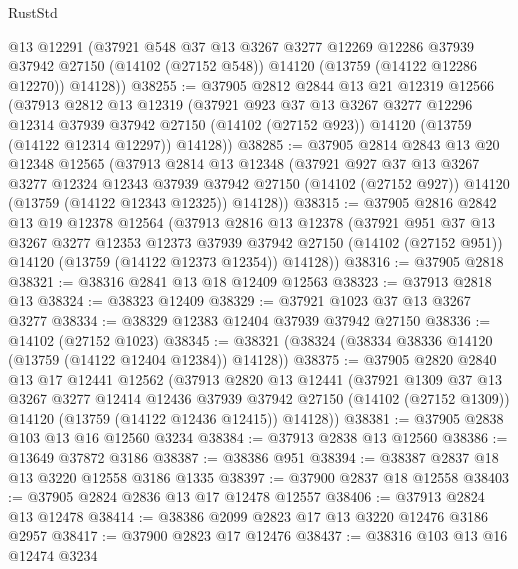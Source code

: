 \begin{lexlean}{RustStd}
\begin{coremodule}
      @13
      @12291
      (@37921
        @548
        @37
        @13
        @3267
        @3277
        @12269
        @12286
        @37939
        @37942
        @27150
        (@14102 (@27152 @548))
        @14120
        (@13759 (@14122 @12286 @12270))
        @14128))
@38255 := @37905
    @2812
    @2844
    @13
    @21
    @12319
    @12566
    (@37913
      @2812
      @13
      @12319
      (@37921
        @923
        @37
        @13
        @3267
        @3277
        @12296
        @12314
        @37939
        @37942
        @27150
        (@14102 (@27152 @923))
        @14120
        (@13759 (@14122 @12314 @12297))
        @14128))
@38285 := @37905
    @2814
    @2843
    @13
    @20
    @12348
    @12565
    (@37913
      @2814
      @13
      @12348
      (@37921
        @927
        @37
        @13
        @3267
        @3277
        @12324
        @12343
        @37939
        @37942
        @27150
        (@14102 (@27152 @927))
        @14120
        (@13759 (@14122 @12343 @12325))
        @14128))
@38315 := @37905
    @2816
    @2842
    @13
    @19
    @12378
    @12564
    (@37913
      @2816
      @13
      @12378
      (@37921
        @951
        @37
        @13
        @3267
        @3277
        @12353
        @12373
        @37939
        @37942
        @27150
        (@14102 (@27152 @951))
        @14120
        (@13759 (@14122 @12373 @12354))
        @14128))
@38316 := @37905 @2818
@38321 := @38316 @2841 @13 @18 @12409 @12563
@38323 := @37913 @2818 @13
@38324 := @38323 @12409
@38329 := @37921 @1023 @37 @13 @3267 @3277
@38334 := @38329 @12383 @12404 @37939 @37942 @27150
@38336 := @14102 (@27152 @1023)
@38345 := @38321 (@38324 (@38334 @38336 @14120 (@13759 (@14122 @12404 @12384)) @14128))
@38375 := @37905
    @2820
    @2840
    @13
    @17
    @12441
    @12562
    (@37913
      @2820
      @13
      @12441
      (@37921
        @1309
        @37
        @13
        @3267
        @3277
        @12414
        @12436
        @37939
        @37942
        @27150
        (@14102 (@27152 @1309))
        @14120
        (@13759 (@14122 @12436 @12415))
        @14128))
@38381 := @37905 @2838 @103 @13 @16 @12560 @3234
@38384 := @37913 @2838 @13 @12560
@38386 := @13649 @37872 @3186
@38387 := @38386 @951
@38394 := @38387 @2837 @18 @13 @3220 @12558 @3186 @1335
@38397 := @37900 @2837 @18 @12558
@38403 := @37905 @2824 @2836 @13 @17 @12478 @12557
@38406 := @37913 @2824 @13 @12478
@38414 := @38386 @2099 @2823 @17 @13 @3220 @12476 @3186 @2957
@38417 := @37900 @2823 @17 @12476
@38437 := @38316
    @103
    @13
    @16
    @12474
    @3234

\end{coremodule}
\end{lexlean}
